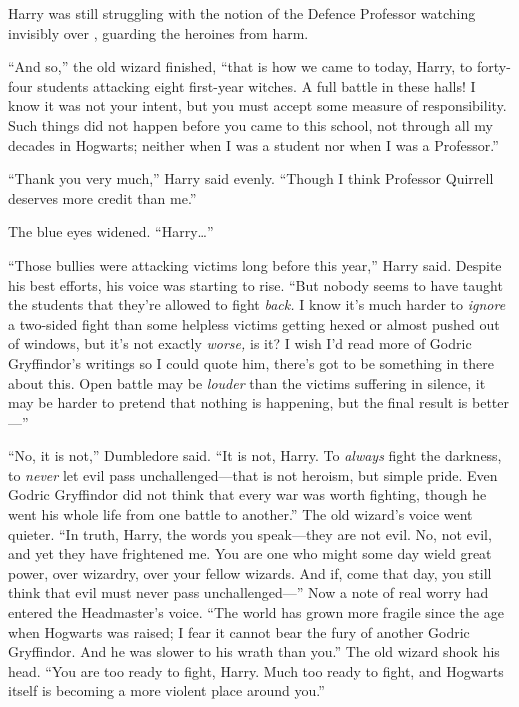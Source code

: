 Harry was still struggling with the notion of the Defence Professor watching invisibly over \SPHEW, guarding the heroines from harm.

“And so,” the old wizard finished, “that is how we came to today, Harry, to forty-four students attacking eight first-year witches. A full battle in these halls! I know it was not your intent, but you must accept some measure of responsibility. Such things did not happen before you came to this school, not through all my decades in Hogwarts; neither when I was a student nor when I was a Professor.”

“Thank you very much,” Harry said evenly. “Though I think Professor Quirrell deserves more credit than me.”

The blue eyes widened. “Harry…”

“Those bullies were attacking victims long before this year,” Harry said. Despite his best efforts, his voice was starting to rise. “But nobody seems to have taught the students that they’re allowed to fight \emph{back.} I know it’s much harder to \emph{ignore} a two-sided fight than some helpless victims getting hexed or almost pushed out of windows, but it’s not exactly \emph{worse,} is it? I wish I’d read more of Godric Gryffindor’s writings so I could quote him, there’s got to be something in there about this. Open battle may be \emph{louder} than the victims suffering in silence, it may be harder to pretend that nothing is happening, but the final result is better—”

“No, it is not,” Dumbledore said. “It is not, Harry. To \emph{always} fight the darkness, to \emph{never} let evil pass unchallenged—that is not heroism, but simple pride. Even Godric Gryffindor did not think that every war was worth fighting, though he went his whole life from one battle to another.” The old wizard’s voice went quieter. “In truth, Harry, the words you speak—they are not evil. No, not evil, and yet they have frightened me. You are one who might some day wield great power, over wizardry, over your fellow wizards. And if, come that day, you still think that evil must never pass unchallenged—” Now a note of real worry had entered the Headmaster’s voice. “The world has grown more fragile since the age when Hogwarts was raised; I fear it cannot bear the fury of another Godric Gryffindor. And he was slower to his wrath than you.” The old wizard shook his head. “You are too ready to fight, Harry. Much too ready to fight, and Hogwarts itself is becoming a more violent place around you.”

